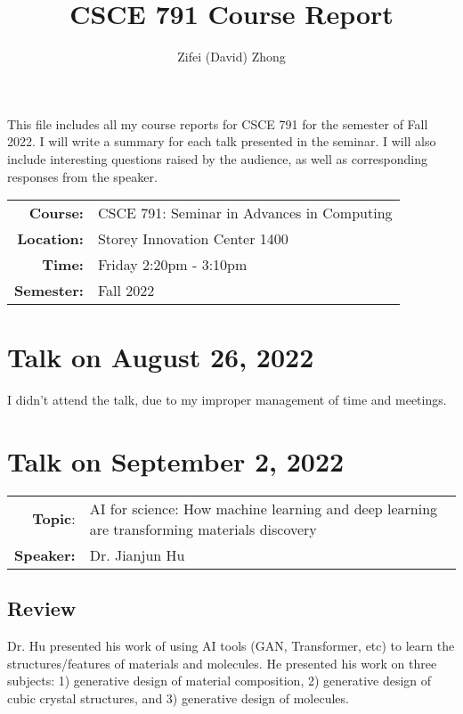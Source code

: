\documentclass[11pt, oneside]{article}   	%
\title{CSCE 791 Course Report}
\author{Zifei (David) Zhong}
\begin{document}
\maketitle

This file includes all my course reports for CSCE 791 for the semester of Fall 2022. I will write a summary for each talk presented in the seminar. I will also include interesting questions raised by the audience, as well as corresponding responses from the speaker.\\

\begin{center}
\begin{tabularx}{0.65\textwidth}{r X}
\textbf{Course:} & CSCE 791: Seminar in Advances in Computing\\
\textbf{Location:} & Storey Innovation Center 1400\\
\textbf{Time:} & Friday 2:20pm - 3:10pm\\
\textbf{Semester:} & Fall 2022
\end{tabularx}
\end{center}

\newpage
\section{Talk on August 26, 2022}
I didn't attend the talk, due to my improper management of time and meetings.

\newpage
\section{Talk on September 2, 2022}
\begin{tabularx} {\textwidth}{r X}
\textbf{Topic}: & AI for science:  How machine learning and deep learning are transforming materials discovery \\
\textbf{Speaker:} & Dr. Jianjun Hu \\
\end{tabularx}

\subsection{Review}
Dr. Hu presented his work of using AI tools (GAN, Transformer, etc) to learn the structures/features of materials and molecules.  He presented his work on three subjects: 1) generative design of material composition, 2) generative design of cubic crystal structures, and 3) generative design of molecules. 
\end{document}
